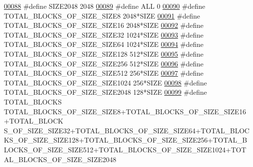 \begin{DoxyCode}
{\hypertarget{memory_management_8h_source_l00088}{}\hyperlink{memory_management_8h_ae9104ca82f0735111c65ef2943c99966}{00088} \textcolor{preprocessor}{#define SIZE2048                          2048}
\hypertarget{memory_management_8h_source_l00089}{}\hyperlink{memory_management_8h_a1edd1ea8bddaf4d9c5eb3eae1ee1726a}{00089} \textcolor{preprocessor}{#define ALL                               0}
\hypertarget{memory_management_8h_source_l00090}{}\hyperlink{memory_management_8h_ab5f38975b627b9ff14858507f9125d53}{00090} \textcolor{preprocessor}{#define TOTAL\_BLOCKS\_OF\_SIZE\_SIZE8        2048*SIZE}
\hypertarget{memory_management_8h_source_l00091}{}\hyperlink{memory_management_8h_a20784e34124fcd1de656baedbd84d808}{00091} \textcolor{preprocessor}{#define TOTAL\_BLOCKS\_OF\_SIZE\_SIZE16       2048*SIZE}
\hypertarget{memory_management_8h_source_l00092}{}\hyperlink{memory_management_8h_a3e6f328c286118e34903b813a2e4fa4b}{00092} \textcolor{preprocessor}{#define TOTAL\_BLOCKS\_OF\_SIZE\_SIZE32       1024*SIZE}
\hypertarget{memory_management_8h_source_l00093}{}\hyperlink{memory_management_8h_abfb779142eb3289eedbcca95b59889a2}{00093} \textcolor{preprocessor}{#define TOTAL\_BLOCKS\_OF\_SIZE\_SIZE64       1024*SIZE}
\hypertarget{memory_management_8h_source_l00094}{}\hyperlink{memory_management_8h_ab6862e75aa51407183d9e6153e6f863a}{00094} \textcolor{preprocessor}{#define TOTAL\_BLOCKS\_OF\_SIZE\_SIZE128      512*SIZE}
\hypertarget{memory_management_8h_source_l00095}{}\hyperlink{memory_management_8h_ae3e1e4f059d7d5dd03379040271159ba}{00095} \textcolor{preprocessor}{#define TOTAL\_BLOCKS\_OF\_SIZE\_SIZE256      512*SIZE}
\hypertarget{memory_management_8h_source_l00096}{}\hyperlink{memory_management_8h_a7abb5a0710b1005554e17339ce295da9}{00096} \textcolor{preprocessor}{#define TOTAL\_BLOCKS\_OF\_SIZE\_SIZE512      256*SIZE}
\hypertarget{memory_management_8h_source_l00097}{}\hyperlink{memory_management_8h_a1d6b157c42ee6e79938e671615b85f23}{00097} \textcolor{preprocessor}{#define TOTAL\_BLOCKS\_OF\_SIZE\_SIZE1024     256*SIZE}
\hypertarget{memory_management_8h_source_l00098}{}\hyperlink{memory_management_8h_a60316eadf39d6b115d483b4129babc07}{00098} \textcolor{preprocessor}{#define TOTAL\_BLOCKS\_OF\_SIZE\_SIZE2048     128*SIZE}
\hypertarget{memory_management_8h_source_l00099}{}\hyperlink{memory_management_8h_a5559d5e7ba501e9762af5f203035df14}{00099} \textcolor{preprocessor}{#define TOTAL\_BLOCKS                     
       TOTAL\_BLOCKS\_OF\_SIZE\_SIZE8+TOTAL\_BLOCKS\_OF\_SIZE\_SIZE16+TOTAL\_BLOCK
      S\_OF\_SIZE\_SIZE32+TOTAL\_BLOCKS\_OF\_SIZE\_SIZE64+TOTAL\_BLOCKS\_OF\_SIZE\_SIZE128+TOTAL\_BLOCKS\_OF\_SIZE\_SIZE256+TOTAL\_BLOCKS\_OF\_SIZE\_SIZE512+TOTAL\_BLOCKS\_OF\_SIZE\_SIZE1024+TOTAL\_BLOCKS\_OF\_SIZE\_SIZE2048}
}
\end{DoxyCode}
